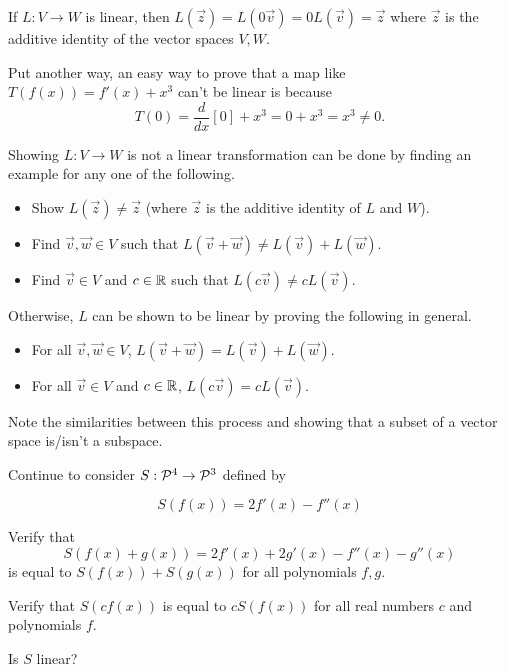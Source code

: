 \begin{fact}
If \(L:V\to W\) is linear, then \(L(\vec z)=L(0\vec v)=0L(\vec v)=\vec z\)
where \(\vec z\) is the additive identity of the vector spaces \(V,W\).

\vspace{1em}

Put another way, an easy way to prove that a map like
\(T(f(x)) = f'(x)+x^3\) can't be linear is because
\[T(0)=\frac{d}{dx}[0]+x^3=0+x^3=x^3\not=0.\]
\end{fact}

\begin{observation}
Showing \(L:V\to W\) is not a linear transformation can be done by finding an example
for any one of the following.

\begin{itemize}
\item Show \(L(\vec z)\not=\vec z\) (where \(\vec z\) is the additive identity of \(L\) and \(W\)).
\item Find \(\vec v,\vec w\in V\) such that \(L(\vec v+\vec w)\not=L(\vec v)+L(\vec w)\).
\item Find \(\vec v\in V\) and \(c\in \IR\) such that \(L(c\vec v)\not=cL(\vec v)\).
\end{itemize}

Otherwise, \(L\) can be shown to be linear by proving the following in general.

\begin{itemize}
\item For all \(\vec v,\vec w\in V\), \(L(\vec v+\vec w)=L(\vec v)+L(\vec w)\).
\item For all \(\vec v\in V\) and \(c\in \IR\), \(L(c\vec v)=cL(\vec v)\).
\end{itemize}

Note the similarities between this process and showing that a subset of a vector
space is/isn't a subspace. 
\end{observation}

\begin{activity}{15}
Continue to consider \(S: \P^4 \rightarrow \P^3\) defined by

\[S(f(x)) = 2f'(x)-f''(x)\]

\begin{subactivity}
  Verify that
  \[S(f(x)+g(x))=2f'(x)+2g'(x)-f''(x)-g''(x)\]
  is equal to \(S(f(x))+S(g(x))\) for all polynomials \(f,g\).
\end{subactivity}
\begin{subactivity}
  Verify that \(S(cf(x))\) is equal to \(cS(f(x))\) for all real numbers \(c\)
  and polynomials \(f\). 
\end{subactivity}
\begin{subactivity}
  Is \(S\) linear?
\end{subactivity}
\end{activity}


